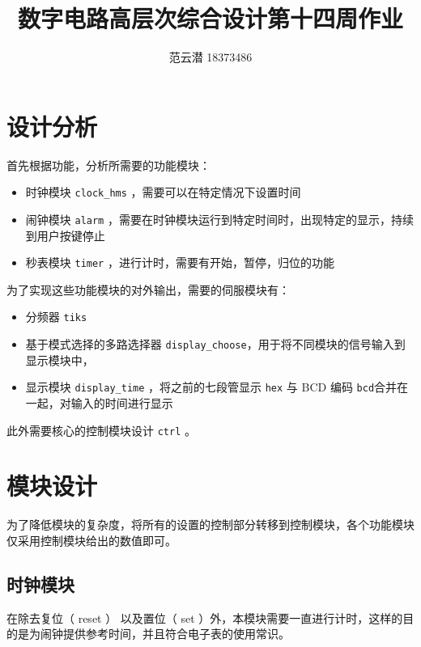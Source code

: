 \documentclass[lang=cn,11pt,a4paper,cite=authoryear]{elegantpaper}
\title{数字电路高层次综合设计\quad 第十四周作业}
\author{范云潜 18373486}
\institute{微电子学院 184111 班}
\date{\zhtoday}
\begin{document}
\maketitle


\tableofcontents

\section{设计分析}

首先根据功能，分析所需要的功能模块：

\begin{itemize}
    \item 时钟模块 \lstinline{clock_hms} ，需要可以在特定情况下设置时间
    \item 闹钟模块 \lstinline{alarm} ，需要在时钟模块运行到特定时间时，出现特定的显示，持续到用户按键停止
    \item 秒表模块 \lstinline{timer} ，进行计时，需要有开始，暂停，归位的功能
\end{itemize}

为了实现这些功能模块的对外输出，需要的伺服模块有：

\begin{itemize}
    \item 分频器 \lstinline{tiks} 
    \item 基于模式选择的多路选择器 \lstinline{display_choose}，用于将不同模块的信号输入到显示模块中，
    \item 显示模块 \lstinline{display_time} ，将之前的七段管显示 \lstinline{hex} 与 BCD 编码 \lstinline{bcd}合并在一起，对输入的时间进行显示
\end{itemize} 

此外需要核心的控制模块设计 \lstinline{ctrl} 。

\section{模块设计}

为了降低模块的复杂度，将所有的设置的控制部分转移到控制模块，各个功能模块仅采用控制模块给出的数值即可。

\subsection{时钟模块}

在除去复位（ reset ） 以及置位（ set ）外，本模块需要一直进行计时，这样的目的是为闹钟提供参考时间，并且符合电子表的使用常识。
\end{document}
